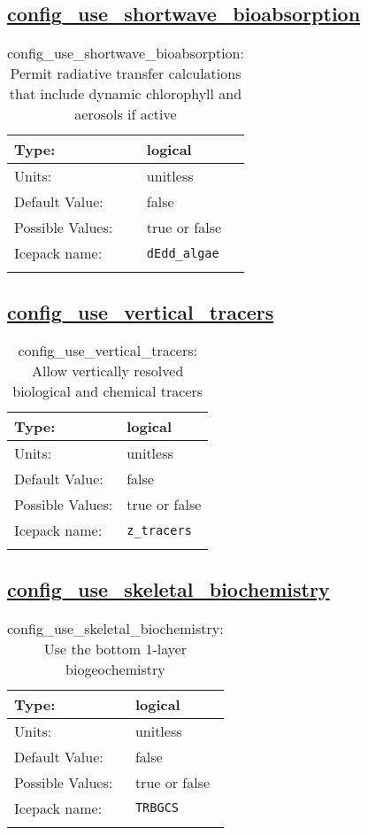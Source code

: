 \subsection[config\_use\_shortwave\_bioabsorption]{\hyperref[sec:nm_tab_biogeochemistry]{config\_use\_shortwave\_bioabsorption}}
\label{subsec:nm_sec_config_use_shortwave_bioabsorption}
\begin{center}
\begin{longtable}{| p{2.0in} || p{4.0in} |}
    \hline
    Type: & logical \\
    \hline
    Units: & \si{unitless} \\
    \hline
    Default Value: & false \\
    \hline
    Possible Values: & true or false \\
    \hline
    \hline
    Icepack name: & \verb+dEdd_algae+ \\
    \caption{config\_use\_shortwave\_bioabsorption: Permit radiative transfer calculations that include dynamic chlorophyll and aerosols if active}
\end{longtable}
\end{center}
\subsection[config\_use\_vertical\_tracers]{\hyperref[sec:nm_tab_biogeochemistry]{config\_use\_vertical\_tracers}}
\label{subsec:nm_sec_config_use_vertical_tracers}
\begin{center}
\begin{longtable}{| p{2.0in} || p{4.0in} |}
    \hline
    Type: & logical \\
    \hline
    Units: & \si{unitless} \\
    \hline
    Default Value: & false \\
    \hline
    Possible Values: & true or false \\
    \hline
    \hline
    Icepack name: & \verb+z_tracers+ \\
    \caption{config\_use\_vertical\_tracers: Allow vertically resolved biological and chemical tracers}
\end{longtable}
\end{center}
\subsection[config\_use\_skeletal\_biochemistry]{\hyperref[sec:nm_tab_biogeochemistry]{config\_use\_skeletal\_biochemistry}}
\label{subsec:nm_sec_config_use_skeletal_biochemistry}
\begin{center}
\begin{longtable}{| p{2.0in} || p{4.0in} |}
    \hline
    Type: & logical \\
    \hline
    Units: & \si{unitless} \\
    \hline
    Default Value: & false \\
    \hline
    Possible Values: & true or false \\
    \hline
    \hline
    Icepack name: & \verb+TRBGCS+ \\
    \caption{config\_use\_skeletal\_biochemistry: Use the bottom 1-layer biogeochemistry}
\end{longtable}
\end{center}
